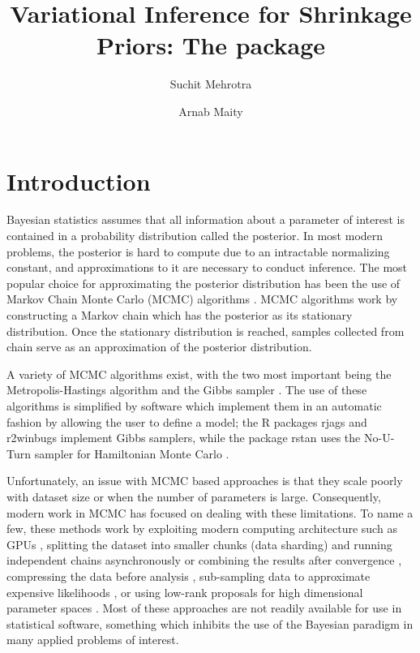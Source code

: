 \documentclass[]{article}
\title{Variational Inference for Shrinkage Priors: The \proglang{R} package 
\pkg{vir}}
\author[1]{Suchit Mehrotra}
\author[1]{Arnab Maity}
\affil[1]{Department of Statistics, North Carolina State University}
\date{}
\let\proglang=\textsf
\newcommand{\pkg}[1]{{\fontseries{b}\selectfont #1}}
\begin{document}
	
\maketitle

\doublespacing

\section{Introduction} \label{sec:vir:intro}

Bayesian statistics assumes that all information about a parameter of interest
is contained in a probability distribution called the posterior. In most modern
problems, the posterior is hard to compute due to an intractable normalizing
constant, and approximations to it are necessary to conduct inference. The most
popular choice for approximating the posterior distribution has been the use of
Markov Chain Monte Carlo (MCMC) algorithms \citep{robert2013monte}.  MCMC
algorithms work by constructing a Markov chain which has the posterior as its
stationary distribution. Once the stationary distribution is reached, samples
collected from chain serve as an approximation of the posterior distribution. 

A variety of MCMC algorithms exist, with the two most important being the
Metropolis-Hastings algorithm \citep{metropolis1953, hastings1970monte} and the
Gibbs sampler \citep{geman1984stochastic, gelfand1990sampling}. The use of these
algorithms is simplified by software which implement them in an automatic
fashion by allowing the user to define a model; the \proglang{R} packages
\pkg{rjags} \citep{plummer2019rjags} and \pkg{r2winbugs} \citep{r2winbugs}
implement Gibbs samplers, while the package \pkg{rstan} \citep{stan2018rstan}
uses the No-U-Turn sampler \citep{hoffman2014no} for Hamiltonian Monte Carlo
\citep{betancourt2017conceptual}.

Unfortunately, an issue with MCMC based approaches is that they scale poorly
with dataset size or when the number of parameters is large. Consequently,
modern work in MCMC has focused on dealing with these limitations. To name a
few, these methods work by exploiting modern computing architecture such as GPUs
\citep{terenin2019gpu}, splitting the dataset into smaller chunks (data
sharding) and running independent chains asynchronously
\citep{terenin2020asynchronous} or combining the results after convergence
\citep{consensusmc, srivastava2015wasp}, compressing the data before analysis
\citep{bayesiancompressed}, sub-sampling data to approximate expensive
likelihoods \citep{quiroz2018speeding, sgdmcmc}, or using low-rank proposals for
high dimensional parameter spaces \citep{saibaba2019efficient}.  Most of these
approaches are not readily available for use in statistical software, something
which inhibits the use of the Bayesian paradigm in many applied problems of
interest. 
\end{document}
